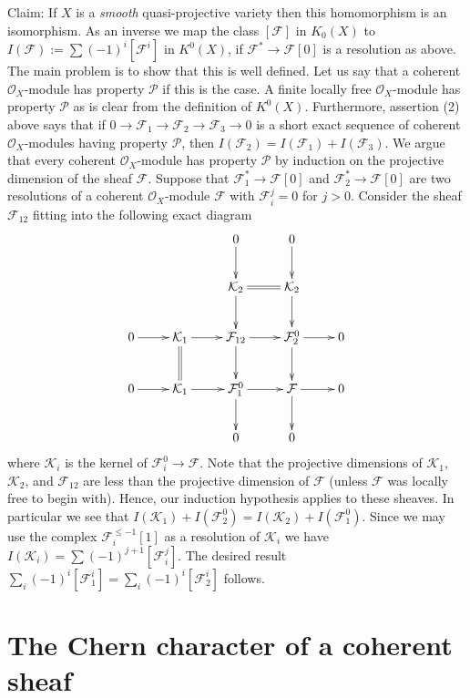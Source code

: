 \medskip\noindent
Claim: If $X$ is a {\it smooth} quasi-projective variety then
this homomorphism is an isomorphism. As an inverse
we map the class $[{\mathcal F}]$ in $K_0(X)$ to $I({\mathcal F}):=
\sum (-1)^i [{\mathcal F}^i]$ in $K^0(X)$, if ${\mathcal F}^* \to {\mathcal F}[0]$
is a resolution as above. The main problem is to show that
this is well defined. Let us say that a coherent ${\mathcal O}_X$-module
has property ${\mathcal P}$ if this is the case.
A finite locally free ${\mathcal O}_X$-module has property ${\mathcal P}$
as is clear from the definition of $K^0(X)$. Furthermore,
assertion (2) above says that if
$
0
\to
{\mathcal F}_1
\to 
{\mathcal F}_2
\to 
{\mathcal F}_3
\to 
0
$
is a short exact sequence of coherent ${\mathcal O}_X$-modules having
property ${\mathcal P}$, then $I({\mathcal F}_2) = I({\mathcal F}_1) + I({\mathcal F}_3)$.
We argue that every coherent ${\mathcal O}_X$-module has property
${\mathcal P}$ by induction on the projective dimension
of the sheaf ${\mathcal F}$. Suppose that
${\mathcal F}_1^* \to {\mathcal F}[0]$ and
${\mathcal F}_2^* \to {\mathcal F}[0]$ are two resolutions of a
coherent ${\mathcal O}_X$-module ${\mathcal F}$ with ${\mathcal F}_i^j=0$
for $j > 0$. Consider the sheaf ${\mathcal F}_{12}$ fitting
into the following exact diagram
$$
\xymatrix{
& & 0\ar[d] & 0\ar[d] &
\cr
& & {\mathcal K}_2 \ar@{=}[r]\ar[d] & {\mathcal K}_2\ar[d] &
\cr
0 \ar[r] & {\mathcal K}_1\ar@{=}[d]\ar[r] & {\mathcal F}_{12}\ar[r]\ar[d] & {\mathcal F}_2^0\ar[r]\ar[d] & 0
\cr
0 \ar[r] & {\mathcal K}_1\ar[r] & {\mathcal F}_{1}^0\ar[r]\ar[d] & {\mathcal F}\ar[d]\ar[r] & 0 \cr
& & 0 & 0 & \cr}
$$
where ${\mathcal K}_i$ is the kernel of ${\mathcal F}^0_i \to {\mathcal F}$.
Note that the projective dimensions of ${\mathcal K}_1$, ${\mathcal K}_2$,
and ${\mathcal F}_{12}$ are less than the projective dimension of
${\mathcal F}$ (unless ${\mathcal F}$ was locally free to begin with). 
Hence, our induction hypothesis applies to these sheaves. In particular
we see that $I({\mathcal K}_1) + I({\mathcal F}_2^0) =
I({\mathcal K}_2) + I({\mathcal F}_1^0)$. Since we may use the complex
${\mathcal F}_i^{\leq -1}[1]$ as a resolution of ${\mathcal K}_i$ 
we have $I({\mathcal K}_i) = \sum (-1)^{j+1}[{\mathcal F}_i^j]$.
The desired result $\sum_i (-1)^i[{\mathcal F}_1^i]
= \sum_i (-1)^i[{\mathcal F}_2^i]$ follows.



\section{The Chern character of a coherent sheaf}
\label{section-chern-coherent}

